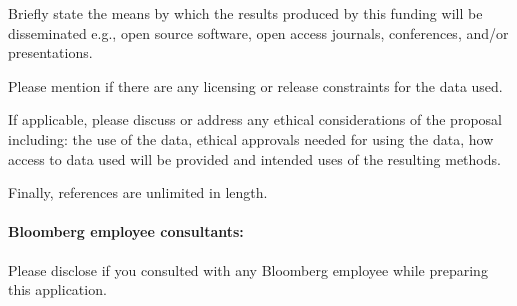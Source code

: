 \documentclass[10pt]{article}
\begin{document}
\begin{multicols*}{2}
Briefly state the means by which the results produced by this funding will be disseminated e.g., open source software, open access journals, conferences, and/or presentations.

Please mention if there are any licensing or release constraints for the data used.

If applicable, please discuss or address any ethical considerations of the proposal including: the use of the data, ethical approvals needed for using the data, how access to data used will be provided and intended uses of the resulting methods.

Finally, references are unlimited in length.


\paragraph{Bloomberg employee consultants:} Please disclose if you consulted with any Bloomberg employee while preparing this application.

\end{multicols*}

\clearpage



	
\end{document}
